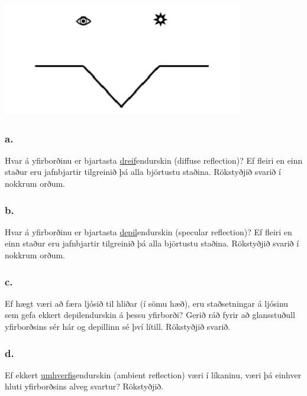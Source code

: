 \documentclass{article}
\begin{document}
\begin{center}
\includegraphics[scale = 0.9]{Endurskin.png}
\end{center}


\subsubsection{a.}Hvar á yfirborðinu er bjartasta \underline{dreif}endurskin (diffuse reflection)? Ef fleiri en
einn staður eru jafnbjartir tilgreinið þá alla björtustu staðina. Rökstyðjið
svarið í nokkrum orðum.

\subsubsection{b.}Hvar á yfirborðinu er bjartasta \underline{depil}endurskin (specular reflection)? Ef fleiri
en einn staður eru jafnbjartir tilgreinið þá alla björtustu staðina. Rökstyðjið
svarið í nokkrum orðum.

\subsubsection{c.}Ef hægt væri að færa ljósið til hliðar (í sömu hæð), eru staðsetningar á ljósinu
sem gefa ekkert depilendurskin á þessu yfirborði? Gerið ráð fyrir að
glansstuðull yfirborðsins sér hár og depillinn sé því lítill. Rökstyðjið svarið.

\subsubsection{d.}Ef ekkert \underline{umhverfis}endurskin (ambient reflection) væri í líkaninu, væri þá
einhver hluti yfirborðsins alveg svartur? Rökstyðjið.
\end{document}
